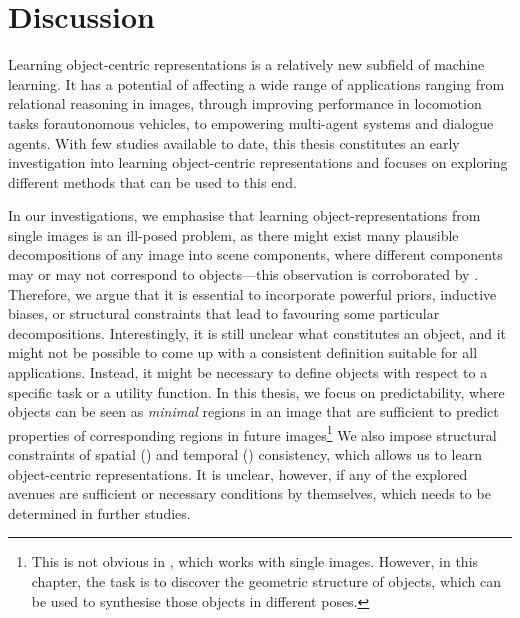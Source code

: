 \chapter{Discussion}
\label{ch:discussion}


Learning object-centric representations is a relatively new subfield of machine learning. It has a potential of affecting a wide range of applications ranging from relational reasoning in images, through improving performance in locomotion tasks for\eg autonomous vehicles, to empowering multi-agent systems and dialogue agents.
With few studies available to date, this thesis constitutes an early investigation into learning object-centric representations and focuses on exploring different methods that can be used to this end.

In our investigations, we emphasise that learning object-representations from single images is an ill-posed problem, as there might exist many plausible decompositions of any image into scene components, where different components may or may not correspond to objects---this observation is corroborated by \cite{Burgess2019monet,Greff2019multi,Engelcke2019genesis}.
Therefore, we argue that it is essential to incorporate powerful priors, inductive biases, or structural constraints that lead to favouring some particular decompositions.
Interestingly, it is still unclear what constitutes an object, and it might not be possible to come up with a consistent definition suitable for all applications.
Instead, it might be necessary to define objects with respect to a specific task or a utility function.
In this thesis, we focus on predictability, where objects can be seen as \textit{minimal} regions in an image that are sufficient to predict properties of corresponding regions in future images\footnote{This is not obvious in , which works with single images. However, in this chapter, the task is to discover the geometric structure of objects, which can be used to synthesise those objects in different poses.}
We also impose structural constraints of spatial () and temporal () consistency, which allows us to learn object-centric representations.
It is unclear, however, if any of the explored avenues are sufficient or necessary conditions by themselves, which needs to be determined in further studies. 

